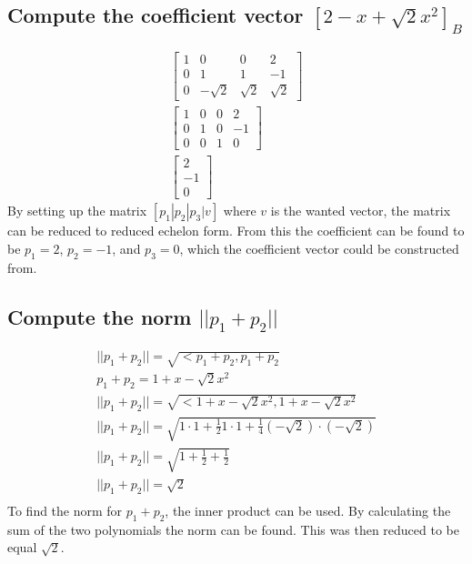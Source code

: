 \documentclass[12pt, a4paper]{article}
\begin{document}
		\subsection{Compute the coefficient vector $[2-x+\sqrt{2}x^2]_B$} 
			\begin{align*}
				\begin{bmatrix}
					1&0&0&2\\
					0&1&1&-1\\
					0&-\sqrt{2}&\sqrt{2}&\sqrt{2}
				\end{bmatrix}\\
				\begin{bmatrix}
					1&0&0&2\\
					0&1&0&-1\\
					0&0&1&0
				\end{bmatrix}\\
				\begin{bmatrix}2\\-1\\0\end{bmatrix}
			\end{align*}
			By setting up the matrix $[p_1|p_2|p_3|v]$ where $v$ is the wanted vector, the matrix can be reduced to reduced echelon form. From this the coefficient can be found to be $p_1=2$, $p_2=-1$, and $p_3=0$, which the coefficient vector could be constructed from.
		\subsection{Compute the norm $||p_1+p_2||$}
			\begin{align*}
				||p_1+p_2||=\sqrt{<p_1+p_2,p_1+p_2}\\
				p_1+p_2=1+x-\sqrt{2}x^2\\
				||p_1+p_2||=\sqrt{<1+x-\sqrt{2}x^2,1+x-\sqrt{2}x^2}\\
				||p_1+p_2||=\sqrt{1\cdot 1 + \frac{1}{2}1\cdot 1 + \frac{1}{4}(-\sqrt{2})\cdot (-\sqrt{2})}\\
				||p_1+p_2||=\sqrt{1+ \frac{1}{2} + \frac{1}{2}}\\
				||p_1+p_2||=\sqrt{2}\\
			\end{align*}
			To find the norm for $p_1+p_2$, the inner product can be used. By calculating the sum of the two polynomials the norm can be found. This was then reduced to be equal $\sqrt{2}$.
	\clearpage
\end{document}
